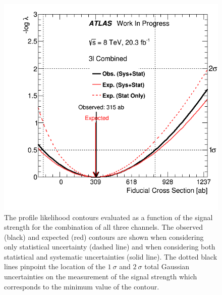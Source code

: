 
\begin{figure}[ht!]
\centering
\includegraphics[scale=0.5]{figures/statistics/measurement/interval/combination.png}
\caption{The profile likelihood contours evaluated as a function of 
the signal strength
for the combination of all three channels. 
The observed (black) and expected (red) contours are shown when 
considering only statistical uncertainty (dashed line) and when considering both statistical and systematic uncertainties (solid line).
The dotted black
lines pinpoint the location of the $1~\sigma$ and $2~\sigma$ total 
Gaussian uncertainties
on the measurement of the signal strength which corresponds to the 
minimum value of the contour.}
\label{fig:stat_measurement_interval_combination}
\end{figure}


